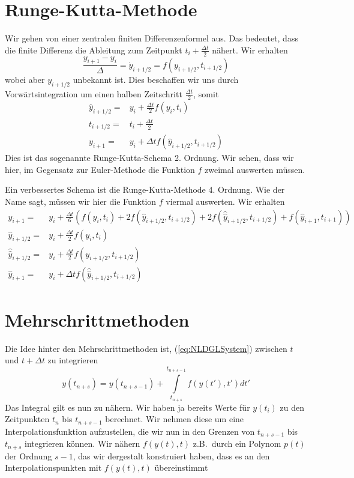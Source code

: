 \section{Runge-Kutta-Methode}
Wir gehen von einer zentralen finiten Differenzenformel aus. Das bedeutet, dass
die finite Differenz die Ableitung zum Zeitpunkt $t_i+\frac{\Delta t}{2}$
nähert. Wir erhalten
\begin{equation}
  \frac{y_{i+1}- y_i}{\Delta}=\dot{y}_{i+1/2}= f(y_{i+1/2},t_{i+1/2})
  \label{eq:Midpoint}
\end{equation}
wobei aber $y_{i+1/2}$ unbekannt ist. Dies beschaffen wir uns durch
Vorwärtsintegration um einen halben Zeitschritt $\frac{\Delta t}{2}$, somit
\begin{align*}
  \hat{y}_{i+1/2}=&y_i+\frac{\Delta t}{2}f(y_{i},t_{i})\\
  t_{i+1/2} =& t_i+\frac{\Delta t}{2}\\
  y_{i+1} =& y_{i}+\Delta t f(\hat{y}_{i+1/2},t_{i+1/2})
\end{align*}
Dies ist das sogenannte Runge-Kutta-Schema 2. Ordnung. Wir sehen, dass wir
hier, im Gegensatz zur Euler-Methode die Funktion $f$ zweimal auswerten müssen.

Ein verbessertes Schema ist die Runge-Kutta-Methode 4. Ordnung. Wie der Name
sagt, müssen wir hier die  Funktion $f$ viermal auswerten. Wir erhalten
\begin{align}\label{eq:RK4order}
  y_{i+1} =& y_{i}+\frac{\Delta t}{6}\left( 
    f(y_i,t_i)+2f(\hat{y}_{i+1/2},t_{i+1/2})+2f(\hat{\hat{y}}_{i+1/2},t_{i+1/2})
  +f(\hat{y}_{i+1},t_{i+1})\right)\\
  \hat{y}_{i+1/2}=&y_i+\frac{\Delta t}{2}f(y_{i},t_{i})\nonumber\\
  \hat{\hat{y}}_{i+1/2}=&y_i+\frac{\Delta t}{2}f(y_{i+1/2},t_{i+1/2})\nonumber\\
  \hat{y}_{i+1}=&y_i+\Delta tf(\hat{\hat{y}}_{i+1/2},t_{i+1/2})\nonumber
\end{align}

\section{Mehrschrittmethoden}
Die Idee hinter den Mehrschrittmethoden ist, (\ref{eq:NLDGLSystem}) zwischen
$t$ und $t+\Delta t$ zu integrieren
\begin{equation*}
y(t_{n+s})=y(t_{n+s-1})+\int\limits_{t_{n+s}}^{t_{n+s-1}}f(y(t'),t')dt'
\end{equation*}
Das Integral gilt es nun zu nähern. Wir haben ja bereits Werte für $y(t_i)$ zu
den Zeitpunkten $t_n$  bis $t_{n+s-1}$ berechnet. Wir nehmen  diese um eine
Interpolationsfunktion aufzustellen, die wir nun in den Grenzen von $t_{n+s-1}$
bis $t_{n+s}$ integrieren können. Wir nähern $f(y(t),t)$ z.B.\ durch ein
Polynom $p(t)$ der Ordnung $s-1$, das wir dergestalt konstruiert haben, dass es an
den Interpolationspunkten mit $f(y(t),t)$ übereinstimmt

